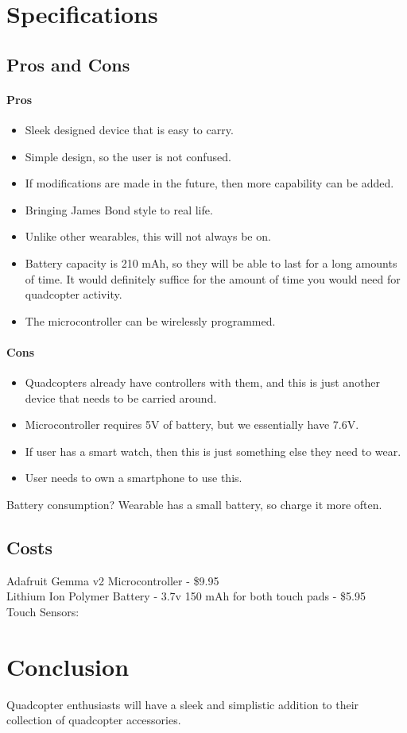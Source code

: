 \documentclass[12pt,letterpaper]{article}
\begin{document}
\section*{Specifications}

\subsection*{Pros and Cons}

\paragraph{Pros}
\begin{itemize}
	\item Sleek designed device that is easy to carry.
	\item Simple design, so the user is not confused.
	\item If modifications are made in the future, then more capability can be added.
	\item Bringing James Bond style to real life.
	\item Unlike other wearables, this will not always be on.
	\item Battery capacity is 210 mAh, so they will be able to last for a long amounts of time. It would definitely suffice for the amount of time you would need for quadcopter activity.
	\item The microcontroller can be wirelessly programmed.
\end{itemize}

\paragraph{Cons}
\begin{itemize}
	\item Quadcopters already have controllers with them, and this is just another device that needs to be carried around.
	\item Microcontroller requires 5V of battery, but we essentially have 7.6V.
	\item If user has a smart watch, then this is just something else they need to wear.
	\item User needs to own a smartphone to use this.
\end{itemize}

Battery consumption?
Wearable has a small battery, so charge it more often.
\subsection*{Costs}
Adafruit Gemma v2 Microcontroller - \$9.95 \\
Lithium Ion Polymer Battery - 3.7v 150 mAh for both touch pads - \$5.95 \\
Touch Sensors: \\



\section*{Conclusion}
Quadcopter enthusiasts will have a sleek and simplistic addition to their collection of quadcopter accessories. 

\newpage
\nocite{*}


\end{document}
